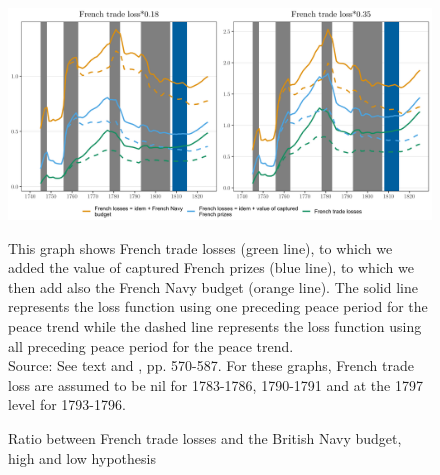 \documentclass[12pt,a4paper,notitlepage,english]{article}
\newcommand{\fontsmall}{\fontsize{10pt}{12pt}\selectfont}
\begin{document}
\begin{appendix}
\begin{figure}[h!]
\caption{Ratio between French trade losses and the British Navy budget, high and low hypothesis}
\label{Ratio_BR_Expenditures}
\centering
\includegraphics[scale=0.17]{ratio_BR_expenditures_annual_loss}
\begin{minipage}{18cm}
\begin{flushleft}
\fontsmall 
This graph shows French trade losses (green line), to which we added the value of captured French prizes (blue line), to which we then add also the French Navy budget (orange line). The solid line represents the loss function using one preceding peace period for the peace trend while the dashed line represents the loss function using all preceding peace period for the peace trend. \\
Source: See text and \cite{mitchell1988}, pp. 570-587. For these graphs, French trade loss are assumed to be nil for 1783-1786, 1790-1791 and at the 1797 level for 1793-1796.
\end{flushleft}
\end{minipage}
\end{figure}


\end{appendix}
\end{document}
